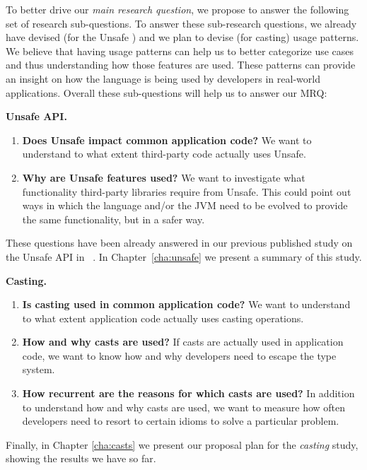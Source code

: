 To better drive our \emph{main research question}, we propose to answer the following set of research sub-questions.
To answer these sub-research questions, we already have devised (for the Unsafe \api{}) and we plan to devise (for casting) usage patterns.
We believe that having usage patterns can help us to better categorize use cases and thus understanding how those features are used.
These patterns can provide an insight on how the language is being used by developers in real-world applications.
Overall these sub-questions will help us to answer our MRQ:

\textbf{Unsafe API.}
\begin{enumerate}[label=$URQ\arabic*:$,ref=$URQ\arabic*$,leftmargin=3.4\parindent]
\item\label{unsafe:rq1}
{\bf Does Unsafe impact common application code?}
We want to understand to what extent third-party code actually uses Unsafe.

\item\label{unsafe:rq2}
{\bf Why are Unsafe features used?}
We want to investigate what functionality third-party libraries require from Unsafe.
This could point out ways in which the \java{} language and/or the JVM need to be evolved to provide the same functionality, but in a safer way.
\end{enumerate}

These questions have been already answered in our previous published study on the Unsafe API in \java{}~\cite{mastrangeloUseYourOwn2015}.
In Chapter~\ref{cha:unsafe} we present a summary of this study.

\textbf{Casting.}
\begin{enumerate}[label=$CRQ\arabic*:$,ref=$CRQ\arabic*$,leftmargin=3.4\parindent]
\item\label{casts:rq1}
{\bf Is casting used in common application code?}
We want to understand to what extent application code actually uses casting operations.

\item\label{casts:rq2}
{\bf How and why casts are used?}
If casts are actually used in application code,
we want to know how and why developers need to escape the type system.

\item\label{casts:rq3}
{\bf How recurrent are the reasons for which casts are used?}
In addition to understand how and why casts are used,
we want to measure how often developers need to resort to certain idioms to solve a particular problem.
\end{enumerate}

Finally, in Chapter \ref{cha:casts} we present our proposal plan for the \emph{casting} study, showing the results we have so far.

